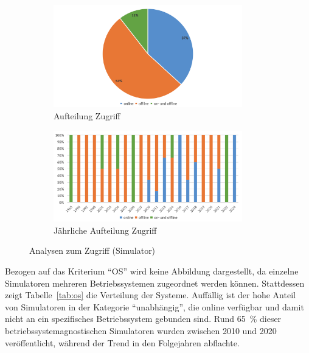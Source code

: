 \begin{figure}[!htbp]
    \centering
    \begin{subfigure}[b]{0.48\textwidth}
        \centering
        \includegraphics[width=0.90\textwidth]{graphics_sim/3-zugriff.png}
        \caption{Aufteilung Zugriff}
        \label{fig:3-zugriff-sim}
    \end{subfigure}
    \hfill
    \begin{subfigure}[b]{0.48\textwidth}
        \centering
        \includegraphics[width=0.90\textwidth]{graphics_sim/4-zugriff-jahr.png}
        \caption{Jährliche Aufteilung Zugriff}
        \label{fig:4-zugriff-jahr-sim}
    \end{subfigure}
    \caption{Analysen zum Zugriff (Simulator)}
    \label{fig:zugriff-gesamt-sim}
\end{figure}

Bezogen auf das Kriterium \enquote{\acs{OS}} wird keine Abbildung dargestellt, da einzelne Simulatoren mehreren Betriebssystemen zugeordnet werden können. Stattdessen zeigt Tabelle~\ref{tab:os} die Verteilung der Systeme. Auffällig ist der hohe Anteil von Simulatoren in der Kategorie \enquote{unabhängig}, die online verfügbar und damit nicht an ein spezifisches Betriebssystem gebunden sind. Rund 65~\% dieser betriebssystemagnostischen Simulatoren wurden zwischen 2010 und 2020 veröffentlicht, während der Trend in den Folgejahren abflachte.

